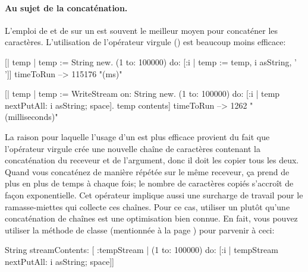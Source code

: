 \documentclass[a4paper,10pt,twoside]{book}
\begin{document}
\paragraph{Au sujet de la concaténation.}
L'emploi de  et de  sur un  est souvent le meilleur moyen pour concaténer 
les caractères.
L'utilisation de l'opérateur virgule (\ct{,}) est beaucoup moins efficace:

\begin{code}{}
[| temp |
  temp := String new.
  (1 to: 100000)
    do: [:i | temp := temp, i asString, ' ']] timeToRun --> 115176 "(ms)"

[| temp |
  temp := WriteStream on: String new.
  (1 to: 100000)
    do: [:i | temp nextPutAll: i asString; space].
  temp contents] timeToRun --> 1262 "(milliseconds)"
\end{code}

La raison pour laquelle l'usage d'un \stream est plus efficace provient
du fait que l'opérateur virgule crée une nouvelle chaîne de caractères
contenant la concaténation du receveur et de l'argument, donc il doit
les copier tous les deux.
Quand vous concaténez de manière répétée sur le même receveur,
ça prend de plus en plus de temps à chaque fois; le nombre
de caractères copiés s'accroît de façon exponentielle.
Cet opérateur implique aussi une surcharge de travail pour le ramasse-miettes qui collecte ces chaînes. 
Pour ce cas, utiliser un \stream plutôt qu'une concaténation de chaînes est une optimisation bien connue.
En fait, vous pouvez utiliser la méthode de classe  (mentionnée à la page \pageref{sec:streamContents}) pour parvenir à ceci:

\begin{code}{}
String streamContents: [ :tempStream |
  (1 to: 100000)
       do: [:i | tempStream nextPutAll: i asString; space]] 
\end{code}

\end{document}
